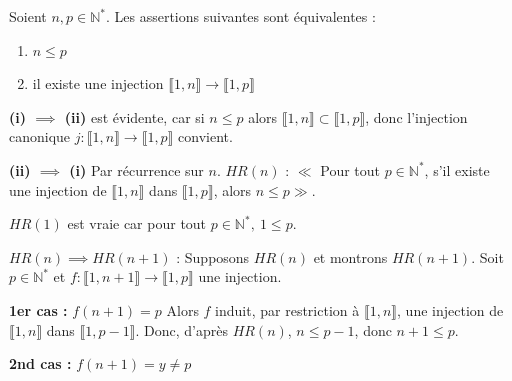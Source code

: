 \documentclass[a4paper,11pt]{article}
\newcommand{\N}{\mathbb{N}}
\begin{document}
\begin{theoreme}
Soient $n, p \in \N^*$. Les assertions suivantes sont équivalentes :
\begin{enumerate}
    \item[(i)] $n \le p$
    \item[(ii)] il existe une injection $\llbracket 1, n \rrbracket \to \llbracket 1, p \rrbracket$
\end{enumerate}
\end{theoreme}

\begin{demonstration}
\textbf{(i) $\implies$ (ii)} est évidente, car si $n \le p$ alors $\llbracket 1, n \rrbracket \subset \llbracket 1, p \rrbracket$, donc l'injection canonique $j : \llbracket 1, n \rrbracket \to \llbracket 1, p \rrbracket$ convient.

\textbf{(ii) $\implies$ (i)} Par récurrence sur $n$.
$HR(n)$ : $\ll$ Pour tout $p \in \N^*$, s'il existe une injection de $\llbracket 1, n \rrbracket$ dans $\llbracket 1, p \rrbracket$, alors $n \le p \gg$.

$HR(1)$ est vraie car pour tout $p \in \N^*, \ 1 \le p$.

$HR(n) \implies HR(n+1)$ :
Supposons $HR(n)$ et montrons $HR(n+1)$.
Soit $p \in \N^*$ et $f : \llbracket 1, n+1 \rrbracket \to \llbracket 1, p \rrbracket$ une injection.

\textbf{1er cas :} $f(n+1) = p$
Alors $f$ induit, par restriction à $\llbracket 1, n \rrbracket$, une injection de $\llbracket 1, n \rrbracket$ dans $\llbracket 1, p-1 \rrbracket$.
Donc, d'après $HR(n)$, $n \le p-1$, donc $n+1 \le p$.

\textbf{2nd cas :} $f(n+1) = y \neq p$

\begin{center}
\end{center}
\end{demonstration}
\end{document}
